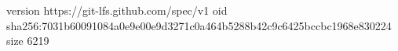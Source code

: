 version https://git-lfs.github.com/spec/v1
oid sha256:7031b60091084a0e9e00e9d3271c0a464b5288b42c9c6425bccbc1968e830224
size 6219
